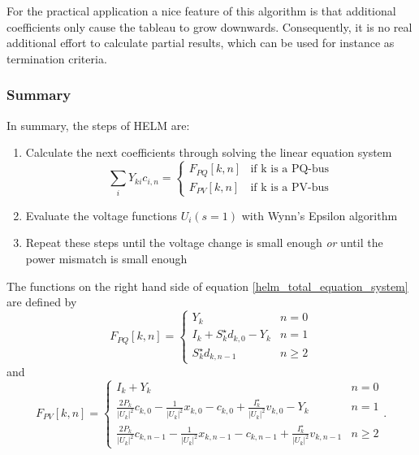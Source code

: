 For the practical application a nice feature of this algorithm is that additional coefficients only cause the tableau to grow downwards. Consequently, it is no real additional effort to calculate partial results, which can be used for instance as termination criteria.

\subsubsection{Summary}
In summary, the steps of HELM are:
\begin{enumerate}
	\item Calculate the next coefficients through solving the linear equation system
	\begin{equation}
		\sum_i Y_{ki} c_{i,n} = 
		\begin{cases}
			F_{PQ}[k,n] & \text{if k is a PQ-bus} \\
			F_{PV}[k,n] & \text{if k is a PV-bus}
		\end{cases}
		\label{eq:helm_total_equation_system}
	\end{equation}
	\item Evaluate the voltage functions $U_i(s = 1)$ with Wynn's Epsilon algorithm
	\item Repeat these steps until the voltage change is small enough \emph{or} until the power mismatch is small enough
\end{enumerate}

The functions on the right hand side of equation \eqref{helm_total_equation_system} are defined by
\begin{equation}
	F_{PQ}[k,n] = 
	\begin{cases}
		Y_k & n = 0 \\
		I_k + S_k^\star d_{k,0} - Y_k & n = 1 \\
		S_k^\star d_{k,n - 1} & n \ge 2
	\end{cases}
\end{equation}
and
\begin{equation}
	F_{PV}[k,n] = 
	\begin{cases}
		I_k + Y_k & n = 0 \\
		\frac{2 P_k}{|U_k|^2} c_{k,0} - \frac{1}{|U_k|^2} x_{k,0} - c_{k,0} + \frac{I_k^\star}{|U_k|^2} v_{k,0} - Y_k & n = 1 \\
		\frac{2 P_k}{|U_k|^2} c_{k,n-1} - \frac{1}{|U_k|^2} x_{k,n-1} - c_{k,n-1} + \frac{I_k^\star}{|U_k|^2} v_{k,n-1} & n \ge 2
	\end{cases}.
\end{equation}

